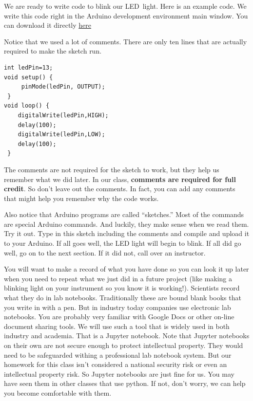 We are ready to write code to blink our LED\ light. Here is an example code. We write this code right in the Arduino development environment main window. You can download it directly
\href{https://raw.githubusercontent.com/rtlines/IntermediateLabPH250/main/Code/IntroBlink.ino}{here}




Notice that we used a lot of comments. There are only ten lines that are
actually required to make the sketch run.

\begin{lstlisting}[language=Arduino] 
int ledPin=13;
void setup() {
	 pinMode(ledPin, OUTPUT);
 }
void loop() {
	digitalWrite(ledPin,HIGH);
	delay(100);
	digitalWrite(ledPin,LOW);
	delay(100);
 }
\end{lstlisting}

The comments are not required for the sketch to work, but they help us remember what we did later. In our class, \textbf{comments are required for full credit}. So don't leave out the comments. In fact, you can add any comments that might help you remember why the code works.

Also notice that Arduino programs are called ``sketches.'' Most of the commands are special Arduino commands. And luckily, they make sense when we read them. Try it out. Type in this sketch including the comments and compile and upload it to your Arduino. If all goes well, the LED light will begin to blink. If all did go well, go on to the next section. If it did not, call over an instructor. 


You will want to make a record of what you have done so you can look it up later when you need to repeat what we just did in a future project (like making a blinking light on your instrument so you know it is working!).  Scientists record what they do in lab notebooks. Traditionally these are bound blank books that you write in with a pen.  But in industry today companies use electronic lab notebooks.  You are probably very familiar with Google Docs or other on-line document sharing tools.  We will use such a tool that is widely used in both industry and academia. That is a Jupyter notebook.  Note that Jupyter notebooks on their own are not secure enough to protect intellectual property. They would need to be safeguarded withing a professional lab notebook system.  But our homework for this class isn't considered a national security risk or even an intellectual property risk. So Jupyter notebooks are just fine for us. You may have seen them in other classes that use python.  If not, don't worry, we can help you become comfortable with them.  

